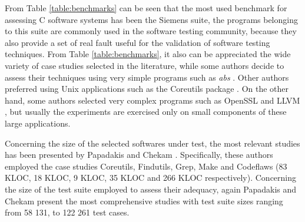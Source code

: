 From Table \ref{table:benchmarks} can be seen that the most used benchmark for assessing C software systems has been the Siemens suite, the programs belonging to this suite are commonly used in the software testing community, because they also provide a set of real fault useful for the validation of software testing techniques.
From Table \ref{table:benchmarks}, it also can be appreciated the wide variety of case studies selected in the literature, while some authors decide to assess their techniques using very simple programs such as \textit{abs} \cite{tokumoto2016muvm}. Other authors preferred using Unix applications such as the Coreutils package \cite{hariri2019comparing,papadakis2018mutation,chekam2017empirical}. 
On the other hand, some authors selected very complex programs such as OpenSSL and LLVM \cite{denisov2018mull}, but usually the experiments are exercised only on small components of these large applications.

Concerning the size of the selected softwares under test, the most relevant studies has been presented by Papadakis and Chekam \cite{papadakis2018mutation,chekam2017empirical,papadakis2018mutant}. Specifically, these authors employed the case studies Coreutils, Findutils, Grep, Make and Codeflaws (83 KLOC, 18 KLOC, 9 KLOC, 35 KLOC and 266 KLOC respectively). 
Concerning the size of the test suite employed to assess their adequacy, again Papadakis and Chekam \cite{papadakis2018mutation,chekam2017empirical,papadakis2018mutant} present the most comprehensive studies with test suite sizes ranging from 58 131, to 122 261 test cases.





